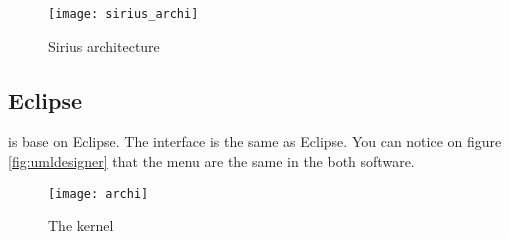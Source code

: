 \begin{figure}[h]
  \centering
  \texttt{[image: sirius\_archi]}
  \caption{Sirius architecture\cite{sirius}}
  \label{fig:sirius}
\end{figure}

\subsection{Eclipse}

\umld is base on Eclipse. 
The interface is the same as Eclipse. You can notice on figure
\ref{fig:umldesigner} that the menu are the same in the both software.



\begin{figure}[h] \centering
  \texttt{[image: archi]}
  \caption{The \umld kernel}
  \label{fig:kernel}
\end{figure}






